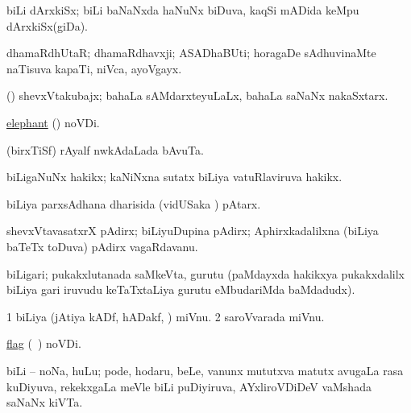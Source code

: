 \bentry
{}
\gl{\nA}
\bmng
biLi dArxkiSx; biLi baNaNxda haNuNx biDuva, kaqSi mADida keMpu dArxkiSx(giDa). 
\emng
\eentry

\bentry
{}
\gl{\nA}
\bmng
dhamaRdhUtaR; dhamaRdhavxji; ASADhaBUti; horagaDe sAdhuvinaMte naTisuva kapaTi, niVca, ayoVgayx. 
\emng
\eentry

\bentry
{}
\gl{\nA}
\bmng
(\Kavi) shevxVtakubajx; bahaLa sAMdarxteyuLaLx, bahaLa saNaNx nakaSxtarx. 
\emng
\eentry

\bentry
{}
\gl{\nA}
\bmng
\hyperref{kandict_e.pdf}{E}{elephant nuga(2)}{elephant} (\nuga{}) noVDi. 
\emng
\eentry

\bentry
{}
\gl{\nA}
\bmng
(birxTiSf) rAyalf nwkAdaLada bAvuTa. 
\emng
\eentry

\bentry
{}
\gl{\nA}
\bmng
biLigaNuNx hakikx; kaNiNxna sutatx biLiya vatuRlaviruva hakikx. 
\emng
\eentry

\bentry
{} 
\gl{\nA}
\expl{}
\bmng
biLiya parxsAdhana dharisida (vidUSaka \mo) pAtarx. 
\emng
\eentry

\bentry
{}
\gl{\nA}
\bmng
shevxVtavasatxrX pAdirx; biLiyuDupina pAdirx; Aphirxkadalilxna (biLiya baTeTx toDuva) pAdirx vagaRdavanu. 
\emng
\eentry

\bentry
{}
\gl{\nA}
\bmng
biLigari; pukakxlutanada saMkeVta, gurutu (paMdayxda hakikxya pukakxdalilx biLiya gari iruvudu keTaTxtaLiya gurutu eMbudariMda baMdadudx). 
\emng
\eentry

\bentry 
{} 
\gl{\nA}
\bmng
\bnum
\num{1} biLiya (jAtiya kADf, hADakf, \mo) miVnu. 
\num{2} saroVvarada miVnu. 
\enum
\emng
\eentry

\bentry
{}
\gl{\nA}
\bmng
\hyperref{kandict_f.pdf}{F}{flag(5) pagu(6)}{flag} (\pagu\ ) noVDi. 
\emng
\eentry

\bentry
{} 
\gl{\nA}
\bmng
biLi -- noNa, huLu; pode, hodaru, beLe, \mo vanunx mututxva matutx avugaLa rasa kuDiyuva, rekekxgaLa meVle biLi puDiyiruva, AYxliroVDiDeV vaMshada saNaNx kiVTa. 
\emng
\eentry

